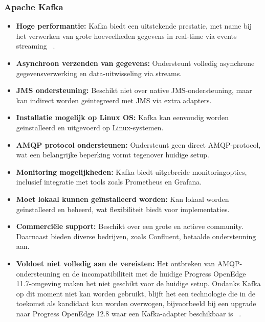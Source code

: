 \subsubsection{Apache Kafka}
\begin{itemize}
    \item \textbf{Hoge performantie:} Kafka biedt een uitstekende prestatie, met name bij het verwerken van grote hoeveelheden gegevens in real-time via events streaming ~\autocite{Ueberfuhr2024}.
    \item \textbf{Asynchroon verzenden van gegevens:} Ondersteunt volledig asynchrone gegevensverwerking en data-uitwisseling via streams.
    \item \textbf{JMS ondersteuning:} Beschikt niet over native JMS-ondersteuning, maar kan indirect worden geïntegreerd met JMS via extra adapters.
    \item \textbf{Installatie mogelijk op Linux OS:} Kafka kan eenvoudig worden geïnstalleerd en uitgevoerd op Linux-systemen.
    \item \textbf{AMQP protocol ondersteunen:} Ondersteunt geen direct AMQP-protocol, wat een belangrijke beperking vormt tegenover huidige setup.
    \item \textbf{Monitoring mogelijkheden:} Kafka biedt uitgebreide monitoringopties, inclusief integratie met tools zoals Prometheus en Grafana.
    \item \textbf{Moet lokaal kunnen geïnstalleerd worden:} Kan lokaal worden geïnstalleerd en beheerd, wat flexibiliteit biedt voor implementaties.
    \item \textbf{Commerciële support:} Beschikt over een grote en actieve community. Daarnaast bieden diverse bedrijven, zoals Confluent, betaalde ondersteuning aan.
    \item \textbf{Voldoet niet volledig aan de vereisten:} Het ontbreken van AMQP-ondersteuning en de incompatibiliteit met de huidige Progress OpenEdge 11.7-omgeving maken het niet geschikt voor de huidige setup.  
    Ondanks Kafka op dit moment niet kan worden gebruikt, blijft het een technologie die in de toekomst als kandidaat kan worden overwogen, 
    bijvoorbeeld bij een upgrade naar Progress OpenEdge 12.8 waar een Kafka-adapter beschikbaar is ~\autocite{Progress2024}.
\end{itemize}

 
